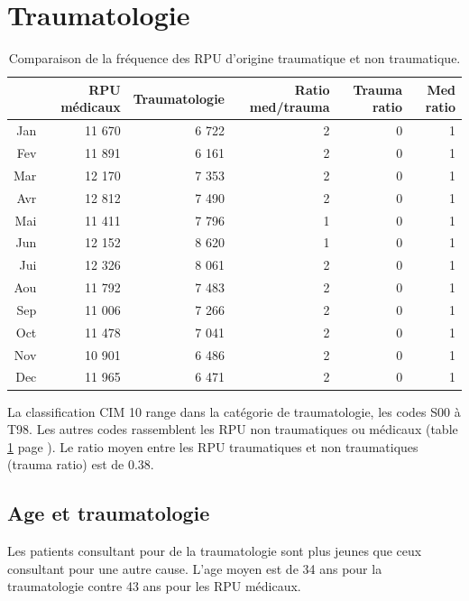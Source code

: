 \documentclass[12pt,english,french,twoside]{book}\usepackage[]{graphicx}\usepackage[]{color}
\begin{document}
\section{Traumatologie}



\begin{table}[ht]
\centering
\begin{tabular}{rrrrrr}
  \hline
 & RPU médicaux & Traumatologie & Ratio med/trauma & Trauma ratio & Med ratio \\ 
  \hline
Jan & 11 670 & 6 722 & 2 & 0 & 1 \\ 
  Fev & 11 891 & 6 161 & 2 & 0 & 1 \\ 
  Mar & 12 170 & 7 353 & 2 & 0 & 1 \\ 
  Avr & 12 812 & 7 490 & 2 & 0 & 1 \\ 
  Mai & 11 411 & 7 796 & 1 & 0 & 1 \\ 
  Jun & 12 152 & 8 620 & 1 & 0 & 1 \\ 
  Jui & 12 326 & 8 061 & 2 & 0 & 1 \\ 
  Aou & 11 792 & 7 483 & 2 & 0 & 1 \\ 
  Sep & 11 006 & 7 266 & 2 & 0 & 1 \\ 
  Oct & 11 478 & 7 041 & 2 & 0 & 1 \\ 
  Nov & 10 901 & 6 486 & 2 & 0 & 1 \\ 
  Dec & 11 965 & 6 471 & 2 & 0 & 1 \\ 
   \hline
\end{tabular}
\caption[RPU traumatiques]{Comparaison de la fréquence des RPU d'origine traumatique et non traumatique.} 
\label{tab:trauma}
\end{table}


La classification CIM 10 range dans la catégorie de traumatologie, les codes S00 à T98. Les autres codes rassemblent les RPU non traumatiques ou médicaux (table \ref{tab:trauma} page \pageref{tab:trauma}). Le ratio moyen entre les RPU traumatiques et non traumatiques (trauma ratio) est de 0.38.

\subsection{Age et traumatologie}

Les patients consultant pour de la traumatologie sont plus jeunes que ceux consultant pour une autre cause. L'age moyen est de 34 ans pour la traumatologie contre 43 ans pour les RPU médicaux. 
\end{document}
